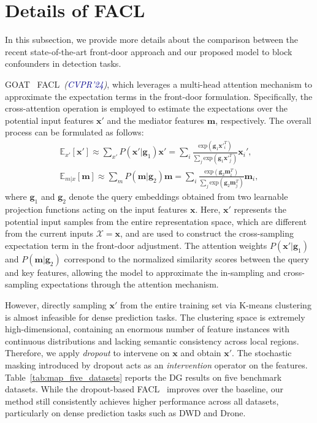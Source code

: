 \documentclass[10pt,twocolumn,letterpaper]{article}
\theoremstyle{plain}
\theoremstyle{definition}
\theoremstyle{remark}
\begin{document}
\section{Details of FACL}
In this subsection, we provide more details about the comparison between the recent state-of-the-art front-door approach and our proposed model to block confounders in detection tasks. 

GOAT~\cite{wang2024vision} FACL~\textit{\scriptsize{(\textcolor{darkblue}{CVPR'24})}}, which leverages a multi-head attention mechanism to approximate the expectation terms in the front-door formulation. Specifically, the cross-attention operation is employed to estimate the expectations over the potential input features $\boldsymbol{x}'$ and the mediator features $\boldsymbol{m}$, respectively. The overall process can be formulated as follows:
{\setlength\abovedisplayskip{0pt}
\setlength\belowdisplayskip{0pt}
\small
\begin{gather}
\mathbb{E}_{x'}[\boldsymbol{x}']\approx\sum_{x'} P(\boldsymbol{x}'|\boldsymbol{g}_1)\boldsymbol{x}'= \sum_i\frac{\text{exp}(\boldsymbol{g}_1 \boldsymbol{x}'^T_i)}{\sum_{j}\text{exp}(\boldsymbol{g}_1 \boldsymbol{x}'^T_j)} \boldsymbol{x}_i', \\
\mathbb{E}_{m|x}[\boldsymbol{m}]\approx\sum_{m} P(\boldsymbol{m}|\boldsymbol{g}_2)\boldsymbol{m}= \sum_i\frac{\text{exp}(\boldsymbol{g}_2 \boldsymbol{m}_i^T)}{\sum_{j}\text{exp}(\boldsymbol{g}_2 \boldsymbol{m}^T_j)} \boldsymbol{m}_i,
\label{eq:FA}
\end{gather}}where $\boldsymbol{g}_1$ and $\boldsymbol{g}_2$ denote the query embeddings obtained from two learnable projection functions acting on the input features $\boldsymbol{x}$.
Here, $\boldsymbol{x}'$ represents the potential input samples from the entire representation space, which are different from the current inputs $\mathcal{X} = \boldsymbol{x}$, and are used to construct the cross-sampling expectation term in the front-door adjustment.
The attention weights $P(\boldsymbol{x}'|\boldsymbol{g}_1)$ and $P(\boldsymbol{m}|\boldsymbol{g}_2)$ correspond to the normalized similarity scores between the query and key features, allowing the model to approximate the in-sampling and cross-sampling expectations through the attention mechanism.

However, directly sampling $\boldsymbol{x}'$ from the entire training set via K-means clustering is almost infeasible for dense prediction tasks. The clustering space is extremely high-dimensional, containing an enormous number of feature instances with continuous distributions and lacking semantic consistency across local regions. Therefore, we apply \textit{dropout} to intervene on $\boldsymbol{x}$ and obtain $\boldsymbol{x}'$. The stochastic masking introduced by dropout acts as an \textit{intervention} operator on the features. Table~\ref{tab:map_five_datasets} reports the DG results on five benchmark datasets. While the dropout-based FACL~\cite{wang2024vision} improves over the baseline, our method still consistently achieves higher performance across all datasets, particularly on dense prediction tasks such as DWD and Drone.
\end{document}
